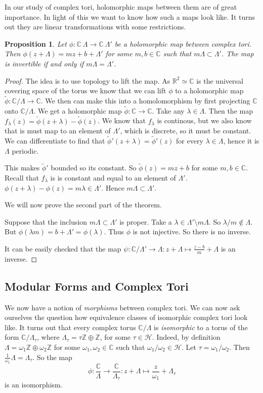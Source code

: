 \documentclass[a4paper]{article}
\theoremstyle{theoremdd}
\newtheorem{proposition}[theorem]{Proposition}
\theoremstyle{definitiondd}
\theoremstyle{remarkdd}
\newcommand{\Z}{\mathbb{Z}}
\newcommand{\C}{\mathbb{C}}
\newcommand{\R}{\mathbb{R}}
\newcommand{\ltr}{\par \noindent \framebox[1\width]{ $\implies$ } \hspace{.2cm}}
\newcommand{\rtl}{\par \noindent \framebox[1\width]{ $\impliedby$ } \hspace{.2cm} }
\begin{document}
In our study of complex tori, holomorphic maps between them are of great importance. 
In light of this we want to know how such a maps look like. It turns out they are linear transformations with some restrictions. 
\begin{proposition}
	Let $\phi: \C \ \Lambda \to \C \ \Lambda'$ be a holomorphic map between complex tori. 
	Then $\phi(z + \Lambda) = mz + b + \Lambda'$ for some $m, b \in \C$ such that $m \Lambda \subset  \Lambda'$. 
	The map is invertible if and only if $m \Lambda = \Lambda'$.
\end{proposition}
\begin{proof}
	The idea is to use topology to lift the map. As $\R^2 \simeq \C$ is the universal covering space of the torus we know that we can lift $\phi$ to a holomorphic map $\tilde \phi: \C / \Lambda \to \C$. We then can make this into a homolomorphism by first projecting $\C$ onto $\C / \Lambda$. We get a holomorphic map  $\tilde \phi: \C \to \C$.
	Take any $\lambda \in \Lambda$. 
	Then the map $f_\lambda(z) = \tilde\phi(z + \lambda) - \tilde \phi(z)$. We know that $f_{\lambda}$ is continous, but we also know that is must map to an element of $\Lambda'$, which is discrete, so it must be constant. 
	We can differentiate to find that $\tilde\phi'(z+ \lambda) = \tilde\phi'(z)$ for every $\lambda \in \Lambda$, hence it is  $\Lambda$ periodic. 

	This makes $\tilde\phi'$ bounded so its constant. 
	So $\tilde \phi(z) = mz + b$ for some $m, b \in \C$. 
	Recall that $f_{\lambda}$ is is constant and equal to an element of $\Lambda'$. 
	$\phi(z+\lambda) - \phi(z) = m\lambda \in \Lambda'$. 
	Hence $m \Lambda \subset \Lambda'$.

	We will now prove the second part of the theorem.
	\ltr Suppose that the inclusion  $m\Lambda \subset \Lambda'$ is proper. 
	Take a $\lambda \in \Lambda' \setminus m\Lambda$. 
	So $\lambda / m \not\in  \Lambda$. But $\phi(\lambda m) = b + \Lambda' = \phi(\lambda)$. Thus $\phi$ is not injective. So there is no inverse.
	\rtl It can be easily checked that the map $\psi: \C / \Lambda' \to \Lambda: z + \Lambda \mapsto  \frac{z-b}{m} + \Lambda$ is an inverse. 
\end{proof}

\subsection{Modular Forms and Complex Tori} \label{sec:modular_forms_and_complex_tori}
We now have a notion of \emph{morphisms} between complex tori. We can now ask ourselves the question how equivalence classes of isomorphic complex tori look like.
It turns out that every complex torus $\C / \Lambda$ is \emph{isomorphic} to a torus of the form $\C / \Lambda_\tau$, where $\Lambda_\tau = \tau \Z \oplus \Z$, for some $\tau \in  \mathcal{H}$. 
Indeed, by definition $\Lambda = \omega_1 \Z \oplus \omega_2 \Z$ for some $\omega_1, \omega_2 \in \C$ such that $\omega_1 / \omega_2 \in \mathcal{H} $. Let $\tau = \omega_1 / \omega_2$. 
Then $\frac{1}{\omega_1} \Lambda = \Lambda_\tau$. 
So the map  \[
\phi: \frac{\C}{ \Lambda} \to \frac{\C}{\Lambda_\tau}: z + \Lambda \mapsto \frac{z}{\omega_1} + \Lambda_\tau
\]
is an isomorphism.
\end{document}
